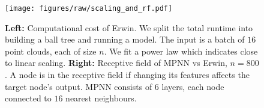 \begin{figure}
    \centering
    \texttt{[image: figures/raw/scaling\_and\_rf.pdf]}
    \vspace{-6pt}
    \caption{\textbf{Left:} Computational cost of Erwin. We split the total runtime into building a ball tree and running a model. The input is a batch of $16$ point clouds, each of size $n$. We fit a power law which indicates close to linear scaling.
    \textbf{Right:} Receptive field of MPNN vs Erwin, $n = 800$. A node is in the receptive field if changing its features affects the target node's output. MPNN consists of 6 layers, each node connected to $16$ nearest neighbours.}
    \label{fig:scaling_and_rf}
\end{figure}
